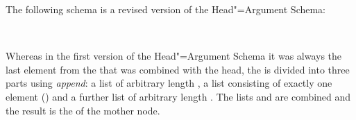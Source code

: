 The following schema is a revised version of the Head"=Argument Schema:
\begin{samepage}
\begin{schema}
\label{schema-bin-prel2}
 \impl\\
\end{schema}
\end{samepage}
Whereas in the first version of the Head"=Argument Schema it was always the last element from the \subcatl that was combined with the head,
the \subcatl is divided into three parts using \emph{append}: a list of arbitrary length ,
a list consisting of exactly one element () and a further list of arbitrary length . The lists  and 
are combined and the result is the \subcatv of the mother node.

